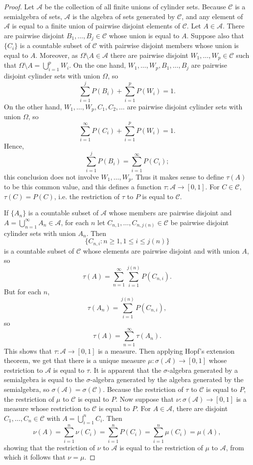 \documentclass{article}
\theoremstyle{definition}
\begin{document}
\begin{proof}
Let $\mathscr{A}$ be the collection of all finite unions of cylinder sets. Because $\mathscr{C}$ is a semialgebra of sets, $\mathscr{A}$ is the algebra of sets generated
by $\mathscr{C}$, and any element of $\mathscr{A}$ is equal to a finite union of pairwise disjoint elements of $\mathscr{C}$. 
Let $A \in \mathscr{A}$.
There are pairwise disjoint $B_1,\ldots,B_j \in \mathscr{C}$ whose union is equal to $A$. Suppose also that
$\{C_i\}$ is a countable subset of  $\mathscr{C}$ with pairwise disjoint members whose union is equal to $A$.
Moreover, as $\Omega \setminus A \in \mathscr{A}$ there are pairwise disjoint $W_1,\ldots,W_p \in \mathscr{C}$ such that
$\Omega \setminus A = \bigcup_{i=1}^p W_i$.
On the one hand, $W_1,\ldots,W_p,B_1,\ldots,B_j$ are pairwise disjoint cylinder sets with union $\Omega$, so
\[
\sum_{i=1}^j P(B_i) + \sum_{i=1}^p P(W_i)=1.
\]
On the other hand, $W_1,\ldots,W_p,C_1,C_2,\ldots$ are pairwise disjoint cylinder sets with union $\Omega$, so
\[
\sum_{i=1}^\infty P(C_i) + \sum_{i=1}^p P(W_i)=1.
\]
Hence,
\[
\sum_{i=1}^j P(B_i) = \sum_{i=1}^\infty P(C_i);
\]
this conclusion does not involve $W_1,\ldots,W_p$. Thus it makes sense to define $\tau(A)$ to be this common value,
and this defines a function
$\tau:\mathscr{A} \to [0,1]$. For $C \in \mathscr{C}$, $\tau(C)=P(C)$, i.e. the restriction of $\tau$ to $P$ is equal to $\mathscr{C}$. 

If $\{A_n\}$ is a countable subset of $\mathscr{A}$ whose members are pairwise disjoint and
$A=\bigcup_{n=1}^\infty A_n \in \mathscr{A}$, 
for each $n$ let $C_{n,1}, \ldots, C_{n,j(n)} \in \mathscr{C}$ be pairwise disjoint cylinder sets with union
$A_n$. Then
\[
\{C_{n,i}: n \geq 1, 1 \leq i \leq j(n)\}
\]
 is a countable subset of $\mathscr{C}$ whose elements are pairwise
disjoint and with union $A$, so
\[
\tau(A) = \sum_{n=1}^\infty \sum_{i=1}^{j(n)} P(C_{n,i}).
\]
But for each $n$, 
\[
\tau(A_n) = \sum_{i=1}^{j(n)} P(C_{n,i}),
\]
so
\[
\tau(A) = \sum_{n=1}^\infty \tau(A_n).
\]
This shows that $\tau:\mathscr{A} \to [0,1]$ is a measure. 
Then applying Hopf's extension theorem, we get that there is a unique measure $\mu:\sigma(\mathscr{A}) \to [0,1]$ 
whose restriction to $\mathscr{A}$ is equal to $\tau$. 
It is apparent that the $\sigma$-algebra generated by a semialgebra is equal to the $\sigma$-algebra generated by the algebra generated
by the semialgebra, so $\sigma(\mathscr{A})=\sigma(\mathscr{C})$.  Because the restriction of $\tau$ to $\mathscr{C}$ is equal to
$P$, the restriction of $\mu$ to $\mathscr{C}$ is equal to $P$. Now suppose that
$\nu:\sigma(\mathscr{A}) \to [0,1]$ is a measure whose restriction to $\mathscr{C}$ is equal to $P$.
For $A \in \mathscr{A}$, there are disjoint $C_1,\ldots,C_n \in \mathscr{C}$ with $A=\bigcup_{i=1}^n C_i$. 
Then
\[
\nu(A) = \sum_{i=1}^n \nu(C_i) = \sum_{i=1}^n P(C_i) = \sum_{i=1}^n \mu(C_i)
=\mu(A),
\]
showing that the restriction of $\nu$ to $\mathscr{A}$ is equal to the restriction of $\mu$ to $\mathscr{A}$, from which it follows
that $\nu=\mu$.
\end{proof}
\end{document}
